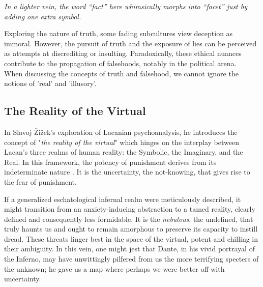 \documentclass[11pt,a4]{article}
\begin{document}
\textit{In a lighter vein, the word “fact” here whimsically morphs into “facet” just by adding one extra symbol.
} \\
\par

Exploring the nature of truth, some fading subcultures view deception as immoral. However, the pursuit of truth and the exposure of lies can be perceived as attempts at discrediting or insulting. Paradoxically, these ethical nuances contribute to the propagation of falsehoods, notably in the political arena.\\

When discussing the concepts of truth and falsehood, we cannot ignore the notions of 'real' and 'illusory'.

    \subsection{The Reality of the Virtual}

        In Slavoj Žižek's exploration of Lacanian psychoanalysis, he introduces the concept of "\textit{the reality of the virtual}" which hinges on the interplay between Lacan's three realms of human reality: the Symbolic, the Imaginary, and the Real.
        In this framework, the potency of punishment derives from its indeterminate nature \cite{Borretzen2012-tx}. It is the uncertainty, the not-knowing, that gives rise to the fear of punishment.

        \par
        If a generalized eschatological infernal realm were meticulously described, it might transition from an anxiety-inducing abstraction to a tamed reality, clearly defined and consequently less formidable. It is the \textit{nebulous}, the undefined, that truly haunts us and ought to remain amorphous to preserve its capacity to instill dread. These threats linger best in the space of the virtual, potent and chilling in their ambiguity. In this vein, one might jest that Dante, in his vivid portrayal of the Inferno, may have unwittingly pilfered from us the more terrifying specters of the unknown; he gave us a map where perhaps we were better off with uncertainty.
\end{document}
